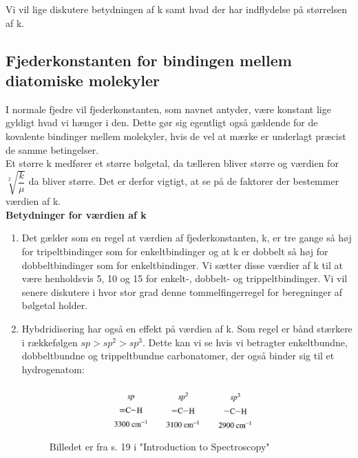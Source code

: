 Vi vil lige diskutere betydningen af k samt hvad der har indflydelse på størrelsen af k. 
\subsection{Fjederkonstanten for bindingen mellem diatomiske molekyler}

I normale fjedre vil fjederkonstanten, som navnet antyder, være konstant lige gyldigt hvad vi hænger i den. Dette gør sig egentligt også gældende for de kovalente bindinger mellem molekyler, hvis de vel at mærke er underlagt præcist de samme betingelser. 
\\

Et større k medfører et større bølgetal, da tælleren bliver større og værdien for $\sqrt[2]{\dfrac{k}{\mu}}$ da bliver større. Det er derfor vigtigt, at se på de faktorer der bestemmer værdien af k.
\\

\textbf{Betydninger for værdien af k}
\begin{enumerate}
\item Det gælder som en regel at værdien af fjederkonstanten, k, er tre gange så høj for tripeltbindinger som for enkeltbindinger og at k er dobbelt så høj for dobbeltbindinger som for enkeltbindinger. Vi sætter disse værdier af k til at være henholdsvis 5, 10 og 15 for enkelt-, dobbelt- og trippeltbindinger. Vi vil senere diskutere i hvor stor grad denne tommelfingerregel for beregninger af bølgetal holder.

\item Hybdridisering har også en effekt på værdien af k. Som regel er bånd stærkere i rækkefølgen $sp > sp^2 > sp^3$. Dette kan vi se hvis vi betragter enkeltbundne, dobbeltbundne og trippeltbundne carbonatomer, der også binder sig til et hydrogenatom:

\begin{center}
\begin{figure}
\includegraphics[scale=1]{Billeder/sp}
\caption{Billedet er fra s. 19 i "Introduction to Spectroscopy"}
\end{figure}
\end{center}


\end{enumerate}

